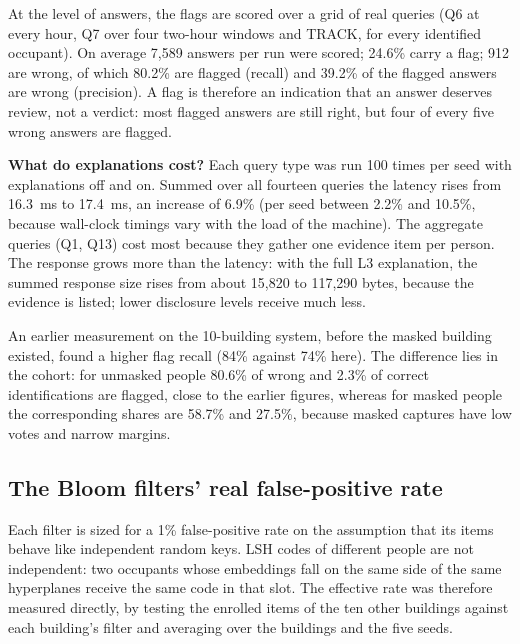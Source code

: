 \documentclass[12pt,a4paper,oneside]{report}
\begin{document}
At the level of answers, the flags are scored over a grid of real queries (Q6 at every hour, Q7 over four two-hour windows and TRACK, for every identified occupant). On average 7,589 answers per run were scored; 24.6\% carry a flag; 912 are wrong, of which 80.2\% are flagged (recall) and 39.2\% of the flagged answers are wrong (precision). A flag is therefore an indication that an answer deserves review, not a verdict: most flagged answers are still right, but four of every five wrong answers are flagged.



\textbf{What do explanations cost?} Each query type was run 100 times per seed with explanations off and on. Summed over all fourteen queries the latency rises from 16.3~ms to 17.4~ms, an increase of 6.9\% (per seed between 2.2\% and 10.5\%, because wall-clock timings vary with the load of the machine). The aggregate queries (Q1, Q13) cost most because they gather one evidence item per person. The response grows more than the latency: with the full L3 explanation, the summed response size rises from about 15,820 to 117,290 bytes, because the evidence is listed; lower disclosure levels receive much less.





An earlier measurement on the 10-building system, before the masked building existed, found a higher flag recall (84\% against 74\% here). The difference lies in the cohort: for unmasked people 80.6\% of wrong and 2.3\% of correct identifications are flagged, close to the earlier figures, whereas for masked people the corresponding shares are 58.7\% and 27.5\%, because masked captures have low votes and narrow margins.

\subsection{The Bloom filters' real false-positive rate}\label{sec:res-bloom}
Each filter is sized for a 1\% false-positive rate on the assumption that its items behave like independent random keys. LSH codes of different people are not independent: two occupants whose embeddings fall on the same side of the same hyperplanes receive the same code in that slot. The effective rate was therefore measured directly, by testing the enrolled items of the ten other buildings against each building's filter and averaging over the buildings and the five seeds.
\end{document}

